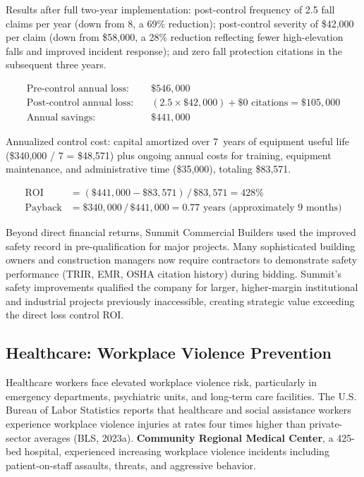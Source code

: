 \documentclass[11pt,openany]{book}
\begin{document}
Results after full two-year implementation: post-control frequency of 2.5 fall
claims per year (down from 8, a 69\% reduction); post-control severity of
\$42{,}000 per claim (down from \$58{,}000, a 28\% reduction reflecting fewer
high-elevation falls and improved incident response); and zero fall protection
citations in the subsequent three years.

\begin{align*}
\text{Pre-control annual loss:} \quad & \$546{,}000 \\
\text{Post-control annual loss:} \quad & (2.5 \times \$42{,}000) + \$0
  \text{ citations} = \$105{,}000 \\
\text{Annual savings:} \quad & \$441{,}000
\end{align*}

Annualized control cost: capital amortized over 7~years of equipment useful
life (\$340{,}000 / 7 = \$48{,}571) plus ongoing annual costs for training,
equipment maintenance, and administrative time (\$35{,}000), totaling
\$83{,}571.

\begin{align*}
\text{ROI} &= (\$441{,}000 - \$83{,}571)\,/\,\$83{,}571 = 428\% \\
\text{Payback} &= \$340{,}000\,/\,\$441{,}000 = 0.77
  \text{ years (approximately 9 months)}
\end{align*}

Beyond direct financial returns, Summit Commercial Builders used the improved
safety record in pre-qualification for major projects. Many sophisticated
building owners and construction managers now require contractors to
demonstrate safety performance (TRIR, EMR, OSHA citation history) during
bidding. Summit's safety improvements qualified the company for larger,
higher-margin institutional and industrial projects previously inaccessible,
creating strategic value exceeding the direct loss control ROI.

\subsection{Healthcare: Workplace Violence Prevention}
\label{subsec:hospital}

Healthcare workers face elevated workplace violence risk, particularly in
emergency departments, psychiatric units, and long-term care facilities. The
U.S. Bureau of Labor Statistics reports that healthcare and social assistance
workers experience workplace violence injuries at rates four times higher than
private-sector averages (BLS, 2023a). \textbf{Community Regional Medical
Center}, a 425-bed hospital, experienced increasing workplace violence
incidents including patient-on-staff assaults, threats, and aggressive
behavior.
\end{document}
